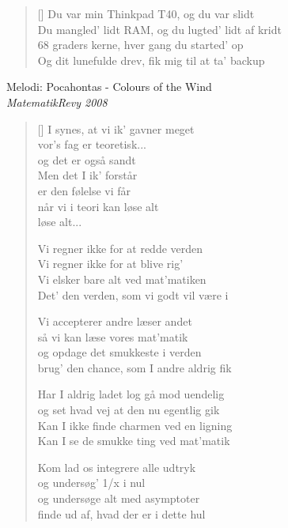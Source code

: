 \begin{multicols}{2}
\begin{verse}[\versewidth]
Du var min Thinkpad T40, og du var slidt\\
Du mangled' lidt RAM, og du lugted' lidt af kridt\\
68 graders kerne, hver gang du started' op\\
Og dit lunefulde drev, fik mig til at ta' backup
\end{verse}
\end{multicols}
\newpage

{Melodi: Pocahontas - Colours of the Wind}\\[.2em]
{\small\itshape MatematikRevy 2008}

\begin{multicols}{2}
\settowidth{\versewidth}{Har I aldrig ladet log gå mod uendelig}
\begin{verse}[\versewidth]
I synes, at vi ik’ gavner meget\\
vor’s fag er teoretisk...\\
\hspace{5em}og det er også sandt\\
Men det I ik’ forstår\\
er den følelse vi får\\
når vi i teori kan løse alt\\
løse alt...

Vi regner ikke for at redde verden\\
Vi regner ikke for at blive rig’\\
Vi elsker bare alt ved mat’matiken\\
Det’ den verden, som vi godt vil være i

Vi accepterer andre læser andet\\
så vi kan læse vores mat’matik\\
og opdage det smukkeste i verden\\
brug’ den chance, som I andre aldrig fik

Har I aldrig ladet log gå mod uendelig\\
og set hvad vej at den nu egentlig gik\\
Kan I ikke finde charmen ved en ligning\\
Kan I se de smukke ting ved mat’matik

Kom lad os integrere alle udtryk\\
og undersøg’ 1/x i nul\\
og undersøge alt med asymptoter\\
finde ud af, hvad der er i dette hul


\end{verse}
\end{multicols}
